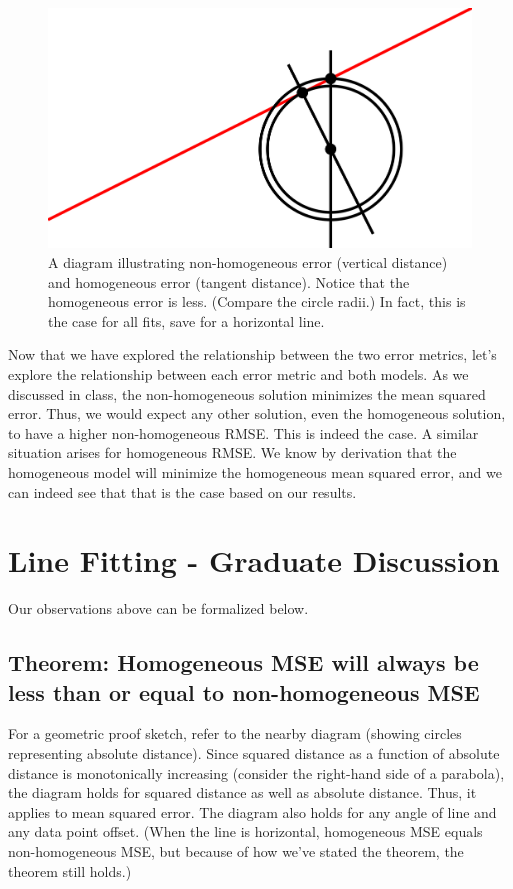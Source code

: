 \documentclass{article}
\begin{document}
\begin{figure}[!ht]
	\centering
	\includegraphics[width=120mm]{figs/error_comparison.png}
	\caption{A diagram illustrating non-homogeneous error (vertical distance) 
        and homogeneous error (tangent distance). Notice that the homogeneous 
        error is less. (Compare the circle radii.) In fact, this is the case for 
        all fits, save for a horizontal line.}
\end{figure}

Now that we have explored the relationship between the two error metrics, let's 
explore the relationship between each error metric and both models. As we 
discussed in class, the non-homogeneous solution minimizes the mean squared 
error. Thus, we would expect any other solution, even the homogeneous solution, 
to have a higher non-homogeneous RMSE. This is indeed the case. A similar 
situation arises for homogeneous RMSE. We know by derivation that the 
homogeneous model will minimize the homogeneous mean squared error, and we can 
indeed see that that is the case based on our results.

\section{Line Fitting - Graduate Discussion}

Our observations above can be formalized below.

\subsection{Theorem: Homogeneous MSE will always be less than or equal to non-homogeneous MSE}

For a geometric proof sketch, refer to the nearby diagram (showing circles 
representing absolute distance). Since squared distance as a function of 
absolute distance is monotonically increasing (consider the right-hand side of a 
parabola), the diagram holds for squared distance as well as absolute distance. 
Thus, it applies to mean squared error. The diagram also holds for any angle of 
line and any data point offset. (When the line is horizontal, homogeneous MSE 
equals non-homogeneous MSE, but because of how we've stated the theorem, the 
theorem still holds.)
\end{document}
